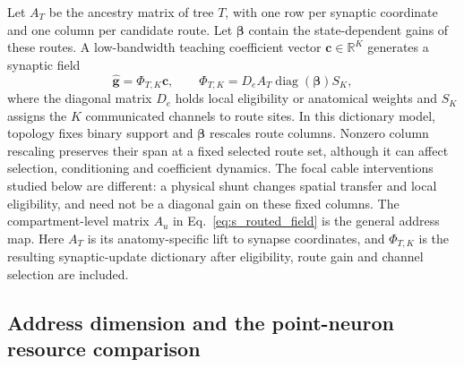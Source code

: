 Let $A_T$ be the ancestry matrix of tree $T$, with one row per synaptic
coordinate and one column per candidate route. Let $\bm\beta$ contain the
state-dependent gains of these routes. A low-bandwidth teaching
coefficient vector $\bm c\in\mathbb R^K$ generates a synaptic field
\begin{equation}
\widehat{\bm g}=\Phi_{T,K}\bm c,
\qquad \Phi_{T,K}=D_eA_T\operatorname{diag}(\bm\beta)S_K,
\label{eq:s_dictionary}
\end{equation}
where the diagonal matrix $D_e$ holds local eligibility or anatomical weights
and $S_K$ assigns
the $K$ communicated channels to route sites. In this dictionary model,
topology fixes binary support and $\bm\beta$ rescales route columns. Nonzero
column rescaling preserves their span at a fixed selected route set, although
it can affect selection, conditioning and coefficient dynamics. The focal
cable interventions studied below are different: a physical shunt changes
spatial transfer and local eligibility, and need not be a diagonal gain on
these fixed columns.
The compartment-level matrix $A_u$ in Eq.~\ref{eq:s_routed_field} is the
general address map. Here $A_T$ is its anatomy-specific lift to synapse
coordinates, and $\Phi_{T,K}$ is the resulting synaptic-update dictionary
after eligibility, route gain and channel selection are included.

\subsection{Address dimension and the point-neuron resource comparison}

